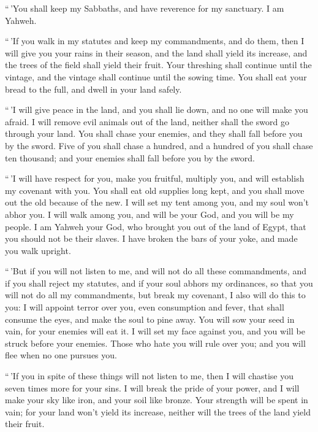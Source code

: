  ``\,'You shall keep my Sabbaths, and have reverence for
my sanctuary. I am Yahweh.

 ``\,'If you walk in my statutes and keep my commandments,
and do them,  then I will give you your rains in their
season, and the land shall yield its increase, and the trees of the
field shall yield their fruit.  Your threshing shall
continue until the vintage, and the vintage shall continue until the
sowing time. You shall eat your bread to the full, and dwell in your
land safely.

 ``\,'I will give peace in the land, and you shall lie
down, and no one will make you afraid. I will remove evil animals out of
the land, neither shall the sword go through your land. 
You shall chase your enemies, and they shall fall before you by the
sword.  Five of you shall chase a hundred, and a hundred
of you shall chase ten thousand; and your enemies shall fall before you
by the sword.

 ``\,'I will have respect for you, make you fruitful,
multiply you, and will establish my covenant with you. 
You shall eat old supplies long kept, and you shall move out the old
because of the new.  I will set my tent among you, and my
soul won't abhor you.  I will walk among you, and will be
your God, and you will be my people.  I am Yahweh your
God, who brought you out of the land of Egypt, that you should not be
their slaves. I have broken the bars of your yoke, and made you walk
upright.

 ``\,'But if you will not listen to me, and will not do
all these commandments,  and if you shall reject my
statutes, and if your soul abhors my ordinances, so that you will not do
all my commandments, but break my covenant,  I also will
do this to you: I will appoint terror over you, even consumption and
fever, that shall consume the eyes, and make the soul to pine away. You
will sow your seed in vain, for your enemies will eat it.
 I will set my face against you, and you will be struck
before your enemies. Those who hate you will rule over you; and you will
flee when no one pursues you.

 ``\,'If you in spite of these things will not listen to
me, then I will chastise you seven times more for your sins.
 I will break the pride of your power, and I will make
your sky like iron, and your soil like bronze.  Your
strength will be spent in vain; for your land won't yield its increase,
neither will the trees of the land yield their fruit.

